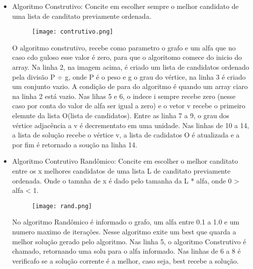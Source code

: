 \documentclass[12pt, fleqn]{article}
\begin{document}
	  \begin{itemize}
	    \item Algoritmo Construtivo:
		\quad Concite em escolher sempre o melhor candidato de uma lista de canditato previamente ordenada.
	      \begin{figure}[!htpb]
		\texttt{[image: contrutivo.png]}
		\label{fig:contrutivo}
	      \end{figure}  
	      
	      \quad O algoritmo construtivo, recebe como parametro o grafo e um alfa que no caso cdo guloso esse valor é zero, 
	      para que o algoritomo comece do inicio do array. Na linha 2, na imagem acima, é criado um lista de candidatos ordenado pela divisão  P $\div$ g, onde P é o peso e g o grau do vértice, na linha 3 é criado um conjunto vazio.
	      A condição de para do algoritmo é quando um array ciaro na linha 2 está vazio.	      
	      \quad Nas lihas 5 e 6, o indece i sempre recebe zero (nesse caso por conta do valor de alfa ser igual a zero)
		    e o vetor v recebe o primeiro elemnte da lista O(lista de candidatos).	
	      \quad Entre as linha 7 a 9, o grau dos vértice adjacência a v é decrementato em uma unidade. 
		    Nas linhas de 10 a 14, a lista de solução recebe o vértice v,
		    a lista de cadidatos O é atualizada e a por fim é retornado a soução na linha 14. 
	    
	    \newpage
	    
	    \item Algoritmo Contrutivo Randômico:
		\quad Concite em escolher o melhor canditato entre os x melhores candidatos de uma lista L de canditato previamente ordenada. 
		Onde o tamnha de x é dado pelo tamanha da L * alfa, onde 0 > alfa < 1.
		\\
	      \begin{figure}[!htpb]
		\texttt{[image: rand.png]}
		\label{fig:randomico}
	      \end{figure}
	      
	      \quad No algoritmo Randômico é informado o grafo, um alfa entre 0.1 a 1.0 e um numero maximo de iterações.
		  Nesse algoritmo exite um best que quarda a melhor solução gerado pelo algoritmo.
		  Nas linha 5, o algoritmo Construtivo é chamado, retornando uma solu para o alfa informado.
		  Nas linhas de 6 a 8 é verificafo se a solução corrente é a melhor, caso seja, best recebe a solução.
		  

\end{itemize}
\end{document}

